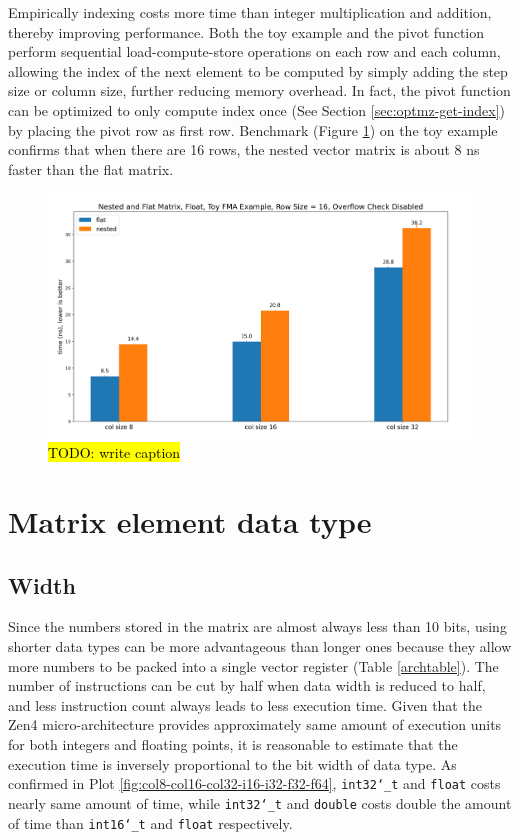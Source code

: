 \documentclass[logo,bsc,singlespacing,parskip]{infthesis}
\newcommand{\dtshort}{\texttt{int16\char`_t} }
\newcommand{\dtint}{\texttt{int32\char`_t} }
\newcommand{\dtfloat}{\texttt{float} }
\newcommand{\dtdouble}{\texttt{double} }
\begin{document}
Empirically indexing costs more time than integer multiplication and addition,
thereby improving performance. Both the toy example and the pivot function
perform sequential load-compute-store operations on each row and each column,
allowing the index of the next element to be computed by simply adding the step
size or column size, further reducing memory overhead. In fact, the pivot
function can be optimized to only compute index once (See Section
\ref{sec:optmz-get-index}) by placing the pivot row as first row. Benchmark
(Figure \ref{fig:nested-flat}) on the toy example confirms that when there are
16 rows, the nested vector matrix is about 8 ns faster than the flat matrix.

\begin{figure}
    \includegraphics[width=\linewidth]{image/nested-flat.jpg}
    \caption{\hl{TODO: write caption}}
    \label{fig:nested-flat}
\end{figure}


\section{Matrix element data type}


\subsection{Width}
\label{sec:width} 
Since the numbers stored in the matrix are almost always less than 10 bits,
using shorter data types can be more advantageous than longer ones because they
allow more numbers to be packed into a single vector register (Table
\ref{archtable}). The number of instructions can be cut by half when data width
is reduced to half, and less instruction count always leads to less execution
time. Given that the Zen4 micro-architecture provides approximately same amount
of execution units for both integers and floating points, it is reasonable to
estimate that the execution time is inversely proportional to the bit width of
data type. As confirmed in Plot \ref{fig:col8-col16-col32-i16-i32-f32-f64},
\dtint and \dtfloat costs nearly same amount of time, while \dtint and \dtdouble
costs double the amount of time than \dtshort and \dtfloat respectively.
\end{document}

